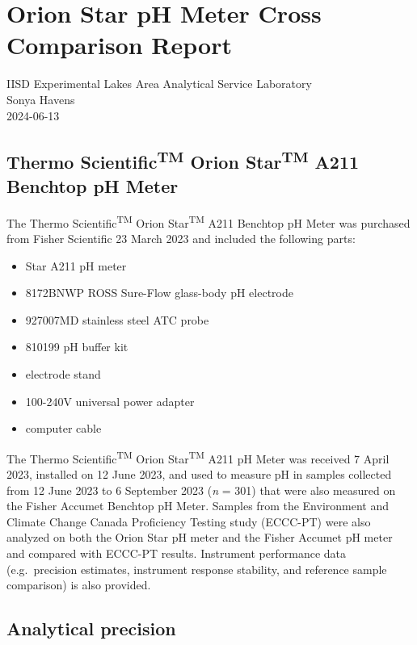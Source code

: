 \documentclass[
]{article}
\author{}
\date{\vspace{-2.5em}}
\providecommand{\tightlist}{%
  \setlength{\itemsep}{0pt}\setlength{\parskip}{0pt}}
\begin{document}
\section{Orion Star pH Meter Cross Comparison Report}

IISD Experimental Lakes Area Analytical Service Laboratory\\
Sonya Havens\\
2024-06-13

\subsection{Thermo Scientific\textsuperscript{TM} Orion Star\textsuperscript{TM} A211 Benchtop pH Meter}

The Thermo Scientific\textsuperscript{TM} Orion Star\textsuperscript{TM}
A211 Benchtop pH Meter was purchased from Fisher Scientific 23 March
2023 and included the following parts:

\begin{itemize}
\tightlist
\item
  Star A211 pH meter
\item
  8172BNWP ROSS Sure-Flow glass-body pH electrode
\item
  927007MD stainless steel ATC probe
\item
  810199 pH buffer kit
\item
  electrode stand
\item
  100-240V universal power adapter
\item
  computer cable
\end{itemize}

The Thermo Scientific\textsuperscript{TM} Orion Star\textsuperscript{TM}
A211 pH Meter was received 7 April 2023, installed on 12 June 2023, and
used to measure pH in samples collected from 12 June 2023 to 6 September
2023 (\emph{n} = 301) that were also measured on the Fisher Accumet
Benchtop pH Meter. Samples from the Environment and Climate Change
Canada Proficiency Testing study (ECCC-PT) were also analyzed on both
the Orion Star pH meter and the Fisher Accumet pH meter and compared
with ECCC-PT results. Instrument performance data (e.g.~precision
estimates, instrument response stability, and reference sample
comparison) is also provided.

\subsection{Analytical precision}
\end{document}
